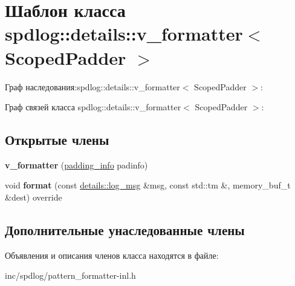 \hypertarget{classspdlog_1_1details_1_1v__formatter}{}\section{Шаблон класса spdlog\+:\+:details\+:\+:v\+\_\+formatter$<$ Scoped\+Padder $>$}
\label{classspdlog_1_1details_1_1v__formatter}


Граф наследования\+:spdlog\+:\+:details\+:\+:v\+\_\+formatter$<$ Scoped\+Padder $>$\+:


Граф связей класса spdlog\+:\+:details\+:\+:v\+\_\+formatter$<$ Scoped\+Padder $>$\+:
\subsection*{Открытые члены}
\begin{DoxyCompactItemize}
\item 
\mbox{\label{classspdlog_1_1details_1_1v__formatter_a51a7272c85996c49b1d8c22d4fddf67f}} 
{\bfseries v\+\_\+formatter} (\hyperlink{structspdlog_1_1details_1_1padding__info}{padding\+\_\+info} padinfo)
\item 
\mbox{\label{classspdlog_1_1details_1_1v__formatter_a00865b962a4e9187799718910fd9a48c}} 
void {\bfseries format} (const \hyperlink{structspdlog_1_1details_1_1log__msg}{details\+::log\+\_\+msg} \&msg, const std\+::tm \&, memory\+\_\+buf\+\_\+t \&dest) override
\end{DoxyCompactItemize}
\subsection*{Дополнительные унаследованные члены}


Объявления и описания членов класса находятся в файле\+:\begin{DoxyCompactItemize}
\item 
inc/spdlog/pattern\+\_\+formatter-\/inl.\+h\end{DoxyCompactItemize}
